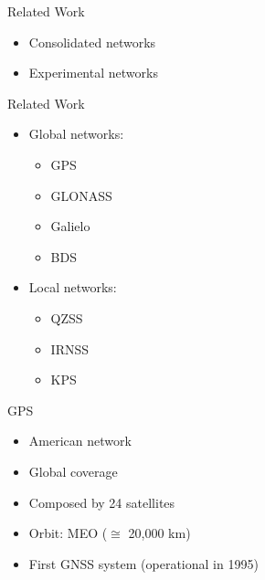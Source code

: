 %
%
%
%
%

%
%
%
%
%


\begin{frame}{Related Work}

    \begin{itemize}
        \item Consolidated networks
        \vspace{0.3cm}
        \item Experimental networks
    \end{itemize}

\end{frame}

\begin{frame}{Related Work}

    \begin{itemize}
        \item Global networks:
            \begin{itemize}
                \item GPS
                \item GLONASS
                \item Galielo
                \item BDS
            \end{itemize}
        \item Local networks:
            \begin{itemize}
                \item QZSS
                \item IRNSS
                \item KPS
            \end{itemize}
    \end{itemize}

\end{frame}

\begin{frame}{GPS}

    \begin{itemize}
        \item American network
        \vspace{0.2cm}
        \item Global coverage
        \vspace{0.2cm}
        \item Composed by 24 satellites
        \vspace{0.2cm}
        \item Orbit: MEO ($\cong$ 20,000 km)
        \vspace{0.2cm}
        \item First GNSS system (operational in 1995)
    \end{itemize}

\end{frame}

